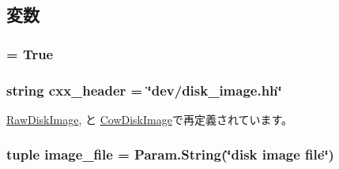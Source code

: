 \subsection{変数}
\hypertarget{classDiskImage_1_1DiskImage_a17fa61ac3806b481cafee5593b55e5d0}{
\subsubsection[{abstract}]{ = True}}
\label{classDiskImage_1_1DiskImage_a17fa61ac3806b481cafee5593b55e5d0}
\hypertarget{classDiskImage_1_1DiskImage_a17da7064bc5c518791f0c891eff05fda}{
\subsubsection[{cxx\_\-header}]{\setlength{\rightskip}{0pt plus 5cm}string {\bf cxx\_\-header} = \char`\"{}dev/disk\_\-image.hh\char`\"{}}}
\label{classDiskImage_1_1DiskImage_a17da7064bc5c518791f0c891eff05fda}


\hyperlink{classDiskImage_1_1RawDiskImage_a17da7064bc5c518791f0c891eff05fda}{RawDiskImage}, と \hyperlink{classDiskImage_1_1CowDiskImage_a17da7064bc5c518791f0c891eff05fda}{CowDiskImage}で再定義されています。\hypertarget{classDiskImage_1_1DiskImage_ac12001087117f0553e2d0bad6e2ab2bf}{
\subsubsection[{image\_\-file}]{\setlength{\rightskip}{0pt plus 5cm}tuple {\bf image\_\-file} = Param.String(\char`\"{}disk image file\char`\"{})}}
\label{classDiskImage_1_1DiskImage_ac12001087117f0553e2d0bad6e2ab2bf}


